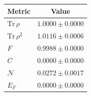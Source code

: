 \begin{tabular}{lc}
\hline
Metric & Value \\
\hline
$\mathrm{Tr}\,\rho$ & $1.0000\pm0.0000$ \\
$\mathrm{Tr}\,\rho^2$ & $1.0116\pm0.0006$ \\
$F$ & $0.9988\pm0.0000$ \\
$C$ & $0.0000\pm0.0000$ \\
$\mathcal{N}$ & $0.0272\pm0.0017$ \\
$E_F$ & $0.0000\pm0.0000$ \\
\hline
\end{tabular}